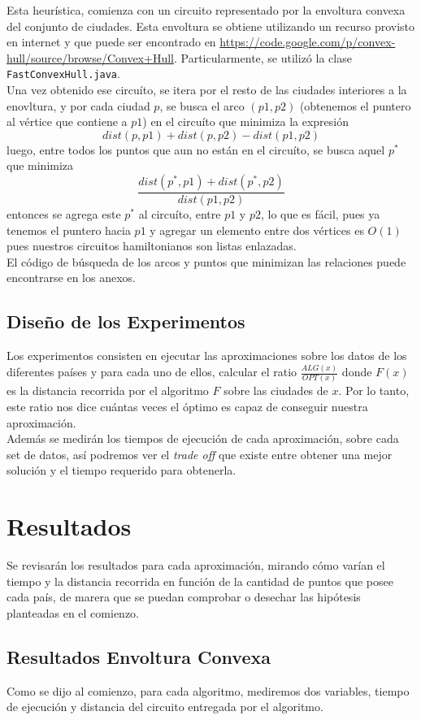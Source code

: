 \documentclass[12pt,letterpaper, margin = 3cm]{article}
\begin{document}
Esta heurística, comienza con un circuito representado por la envoltura convexa del conjunto de ciudades. Esta envoltura se obtiene utilizando un recurso provisto en internet y que puede ser encontrado en \url{https://code.google.com/p/convex-hull/source/browse/Convex+Hull}. Particularmente, se utilizó la clase \verb+FastConvexHull.java+.\\
Una vez obtenido ese circuíto, se itera por el resto de las ciudades interiores a la enovltura, y por cada ciudad $p$, se busca el arco $(p1,p2)$ (obtenemos el puntero al vértice que contiene a $p1$) en el circuíto que minimiza la expresión \[ dist(p,p1)+dist(p,p2)-dist(p1,p2) \] luego, entre todos los puntos que aun no están en el circuíto, se busca aquel $p^*$ que minimiza \[ \frac{dist(p^*,p1)+dist(p^*,p2)}{dist(p1,p2)} \] entonces se agrega este $p^*$ al circuíto, entre $p1$ y $p2$, lo que es fácil, pues ya tenemos el puntero hacia $p1$ y agregar un elemento entre dos vértices es $O(1)$ pues nuestros circuitos hamiltonianos son listas enlazadas.\\
El código de búsqueda de los arcos y puntos que minimizan las relaciones puede encontrarse en los anexos.


\subsection{Diseño de los Experimentos}
Los experimentos consisten en ejecutar las aproximaciones sobre los datos de los diferentes países y para cada uno de ellos, calcular el ratio $\frac{ALG(x)}{OPT(x)}$ donde $F(x)$ es la distancia recorrida por el algoritmo $F$ sobre las ciudades de $x$. Por lo tanto, este ratio nos dice cuántas veces el óptimo es capaz de conseguir nuestra aproximación.\\
Además se medirán los tiempos de ejecución de cada aproximación, sobre cada set de datos, así podremos ver el \textit{trade off} que existe entre obtener una mejor solución y el tiempo requerido para obtenerla.

\newpage
\section{Resultados}
Se revisarán los resultados para cada aproximación, mirando cómo varían el tiempo y la distancia recorrida  en función de la cantidad de puntos que posee cada país, de marera que se puedan comprobar o desechar las hipótesis planteadas en el comienzo.

\subsection{Resultados Envoltura Convexa}
Como se dijo al comienzo, para cada algoritmo, mediremos dos variables, tiempo de ejecución y distancia del circuito entregada por el algoritmo.
\end{document}
